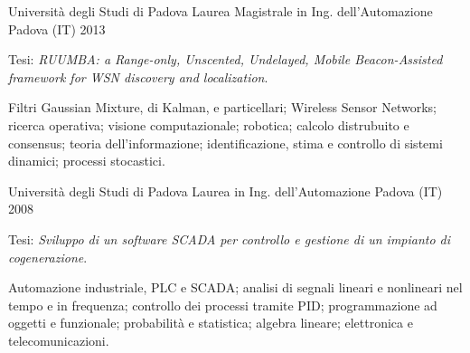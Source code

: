 
\begin{cventries}

	\cventry%
		{Università degli Studi di Padova}
		{Laurea Magistrale in Ing. dell'Automazione}
		{Padova (IT)}
		{2013}
		{\begin{cvitems}
			\item {Tesi: \emph{RUUMBA: a Range-only, Unscented, Undelayed, Mobile Beacon-Assisted framework for WSN discovery and localization}.}
			\item {%
				Filtri Gaussian Mixture, di Kalman, e particellari;
				Wireless Sensor Networks;
				ricerca operativa;
				visione computazionale;
				robotica;
				calcolo distrubuito e consensus;
				teoria dell'informazione;
				identificazione, stima e controllo di sistemi dinamici;
				processi stocastici.
			}
		\end{cvitems}}

	\cventry%
		{Università degli Studi di Padova}
		{Laurea in Ing. dell'Automazione}
		{Padova (IT)}
		{2008}
		{\begin{cvitems}
			\item {Tesi: \emph{Sviluppo di un software SCADA per controllo e gestione di un impianto di cogenerazione}.}
			\item {%
				Automazione industriale, PLC e SCADA;
				analisi di segnali lineari e nonlineari nel tempo e in frequenza;
				controllo dei processi tramite PID;
				programmazione ad oggetti e funzionale;
				probabilità e statistica;
				algebra lineare;
				elettronica e telecomunicazioni.
				}
		\end{cvitems}}


\end{cventries}
